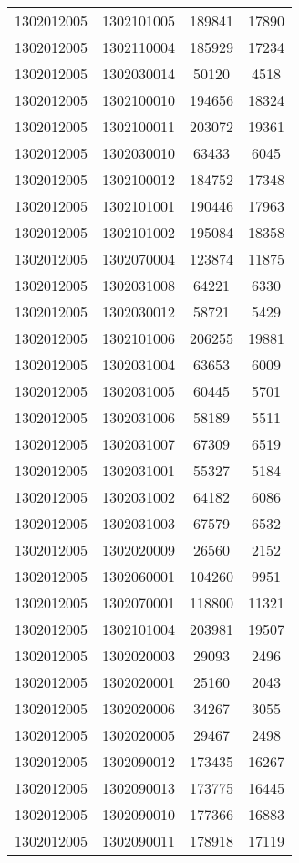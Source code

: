 \begin{longtable}{llcc}
1302012005 & 1302101005 & 189841 & 17890\\
1302012005 & 1302110004 & 185929 & 17234\\
1302012005 & 1302030014 & 50120 & 4518\\
1302012005 & 1302100010 & 194656 & 18324\\
1302012005 & 1302100011 & 203072 & 19361\\
1302012005 & 1302030010 & 63433 & 6045\\
1302012005 & 1302100012 & 184752 & 17348\\
1302012005 & 1302101001 & 190446 & 17963\\
1302012005 & 1302101002 & 195084 & 18358\\
1302012005 & 1302070004 & 123874 & 11875\\
1302012005 & 1302031008 & 64221 & 6330\\
1302012005 & 1302030012 & 58721 & 5429\\
1302012005 & 1302101006 & 206255 & 19881\\
1302012005 & 1302031004 & 63653 & 6009\\
1302012005 & 1302031005 & 60445 & 5701\\
1302012005 & 1302031006 & 58189 & 5511\\
1302012005 & 1302031007 & 67309 & 6519\\
1302012005 & 1302031001 & 55327 & 5184\\
1302012005 & 1302031002 & 64182 & 6086\\
1302012005 & 1302031003 & 67579 & 6532\\
1302012005 & 1302020009 & 26560 & 2152\\
1302012005 & 1302060001 & 104260 & 9951\\
1302012005 & 1302070001 & 118800 & 11321\\
1302012005 & 1302101004 & 203981 & 19507\\
1302012005 & 1302020003 & 29093 & 2496\\
1302012005 & 1302020001 & 25160 & 2043\\
1302012005 & 1302020006 & 34267 & 3055\\
1302012005 & 1302020005 & 29467 & 2498\\
1302012005 & 1302090012 & 173435 & 16267\\
1302012005 & 1302090013 & 173775 & 16445\\
1302012005 & 1302090010 & 177366 & 16883\\
1302012005 & 1302090011 & 178918 & 17119\\

\end{longtable}
